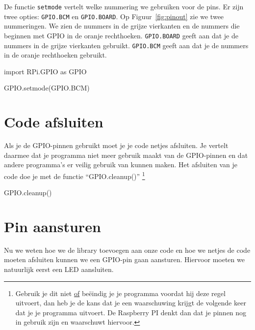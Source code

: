 \documentclass{guide}
\begin{document}
De functie \texttt{setmode} vertelt welke nummering we gebruiken voor de pins. Er zijn twee opties: \texttt{GPIO.BCM} en \texttt{GPIO.BOARD}. Op Figuur~\ref{fig:pinout} zie we twee nummeringen. We zien de nummers in de grijze vierkanten en de nummers die beginnen met GPIO in de oranje rechthoeken. \texttt{GPIO.BOARD} geeft aan dat je de nummers in de grijze vierkanten gebruikt. \texttt{GPIO.BCM} geeft aan dat je de nummers in de oranje rechthoeken gebruikt.

\begin{python}[caption={De GPIO library inladen}, label=code:importeer_library]
import RPi.GPIO as GPIO

GPIO.setmode(GPIO.BCM)
\end{python}

\section{Code afsluiten}
\label{sec:afsluiten}
Als je de GPIO-pinnen gebruikt moet je je code netjes afsluiten. Je vertelt daarmee dat je programma niet meer gebruik maakt van de GPIO-pinnen en dat andere programma's er veilig gebruik van kunnen maken. Het afsluiten van je code doe je met de functie \enquote{GPIO.cleanup()} \footnote{Gebruik je dit niet \underline{of} beëindig je je programma voordat hij deze regel uitvoert, dan heb je de kans dat je een waarschuwing krijgt de volgende keer dat je je programma uitvoert. De Raspberry PI denkt dan dat je pinnen nog in gebruik zijn en waarschuwt hiervoor.}

\begin{python}[caption={De GPIO library inladen}, label=code:afsluiten]
GPIO.cleanup()
\end{python}

\section{Pin aansturen}
\label{sec:pin_aansturen}
Nu we weten hoe we de library toevoegen aan onze code en hoe we netjes de code moeten afsluiten kunnen we een GPIO-pin gaan aansturen. Hiervoor moeten we natuurlijk eerst een LED aansluiten.
\end{document}
